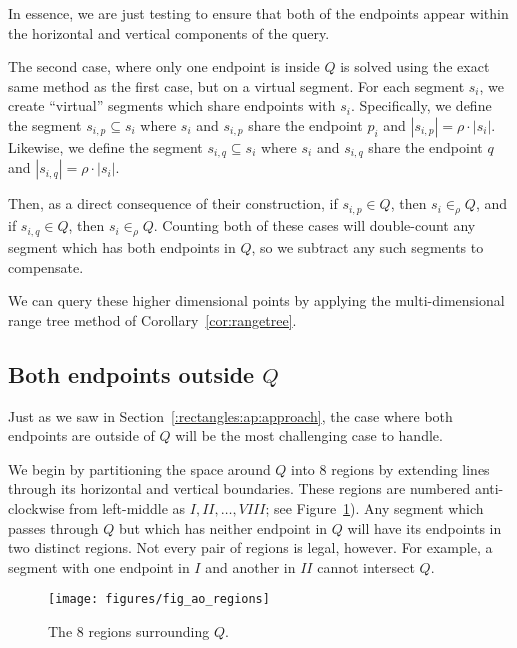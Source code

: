 In essence, we are just testing to ensure that both of the endpoints appear within the horizontal and vertical components of the query.

The second case, where only one endpoint is inside $Q$ is solved using the exact same method as the first case, but on a virtual segment.  For each segment $s_i$, we create ``virtual'' segments which share endpoints with $s_i$.  Specifically, we define the segment $s_{i,p} \subseteq s_i$ where $s_i$ and $s_{i,p}$ share the endpoint $p_i$ and $|s_{i,p}| = \rho \cdot |s_i|$. Likewise, we define the segment $s_{i,q} \subseteq s_i$ where $s_i$ and $s_{i,q}$ share the endpoint $q$ and $|s_{i,q}| = \rho \cdot |s_i|$.

Then, as a direct consequence of their construction, if $s_{i,p} \in Q$, then $s_i \in_\rho Q$, and if $s_{i,q} \in Q$, then $s_i \in_\rho Q$.  Counting both of these cases will double-count any segment which has both endpoints in $Q$, so we subtract any such segments to compensate.

We can query these higher dimensional points by applying the multi-dimensional range tree method of Corollary~\ref{cor:rangetree}.


\subsection{Both endpoints outside $Q$}
\label{:rectangles:ao:bothout}

Just as we saw in Section~\ref{:rectangles:ap:approach}, the case where both endpoints are outside of $Q$ will be the most challenging case to handle.

We begin by partitioning the space around $Q$ into 8 regions by extending lines through its horizontal and vertical boundaries. These regions are numbered anti-clockwise from left-middle as $I, II, \ldots, VIII$; see Figure~\ref{fig:rectangles:ao:regions}). Any segment which passes through $Q$ but which has neither endpoint in $Q$ will have its endpoints in two distinct regions. Not every pair of regions is legal, however. For example, a segment with one endpoint in $I$ and another in $II$ cannot intersect $Q$.

\begin{figure}[t]
\begin{center}
  \texttt{[image: figures/fig\_ao\_regions]}
  \caption{The 8 regions surrounding $Q$.}
  \label{fig:rectangles:ao:regions}
\end{center}
\end{figure}

